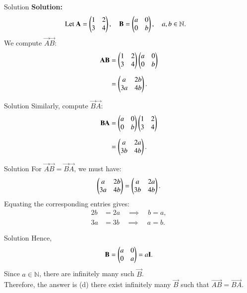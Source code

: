 \documentclass{beamer}
\begin{document}
\begin{frame}{Solution}
\textbf{Solution:} \\
\begin{align}
\text{Let } \mathbf{A} &= \begin{pmatrix}1 & 2 \\ 3 & 4\end{pmatrix}, \quad 
\mathbf{B} = \begin{pmatrix}a & 0 \\ 0 & b\end{pmatrix}, \quad a,b \in \mathbb{N}.
\end{align}
We compute $\vec{A}\vec{B}$:
\begin{align}
\mathbf{A}\mathbf{B} 
&= \begin{pmatrix}1 & 2 \\ 3 & 4\end{pmatrix} \begin{pmatrix}a & 0 \\ 0 & b\end{pmatrix} \\[6pt]
&= \begin{pmatrix}a & 2b \\ 3a & 4b\end{pmatrix}.
\end{align}    
\end{frame}
\begin{frame}{Solution}
Similarly, compute $\vec{B}\vec{A}$:
\begin{align}
\mathbf{B}\mathbf{A} 
&= \begin{pmatrix}a & 0 \\ 0 & b\end{pmatrix} \begin{pmatrix}1 & 2 \\ 3 & 4\end{pmatrix} \\[6pt]
&= \begin{pmatrix}a & 2a \\ 3b & 4b\end{pmatrix}.
\end{align}    
\end{frame}
\begin{frame}{Solution}
For $\vec{A}\vec{B} = \vec{B}\vec{A}$, we must have:
\begin{align}
\begin{pmatrix}a & 2b \\ 3a & 4b\end{pmatrix} = \begin{pmatrix}a & 2a \\ 3b & 4b\end{pmatrix}.
\end{align}
Equating the corresponding entries gives:
\begin{align}
2b &= 2a \quad \implies \quad b = a, \\[6pt]
3a &= 3b \quad \implies \quad a = b.
\end{align}    
\end{frame}
\begin{frame}{Solution}
Hence, 
\begin{align}
\mathbf{B} = \begin{pmatrix}a & 0 \\ 0 & a\end{pmatrix} = a\mathbf{I}.
\end{align}
Since $a \in \mathbb{N}$, there are infinitely many such $\vec{B}$.\\
Therefore, the answer is (d) there exist infinitely many $\vec{B}$ such that $\vec{AB} = \vec{BA}$.    
\end{frame}
\end{document}
